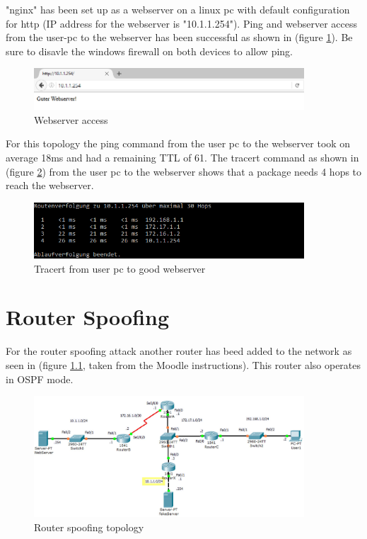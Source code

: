 "nginx" has been set up as a webserver on a linux pc with default configuration for http (IP address for the webserver is "10.1.1.254"). Ping and webserver access from the user-pc to the webserver has been successful as shown in (figure \ref{img:GuterWebserverScreenshot}). Be sure to disavle the windows firewall on both devices to allow ping.

\begin{figure}[H]
	\centering
	\includegraphics[width=0.9\textwidth]{img/GuterWebserverScreenshot.png}
	\caption{Webserver access}
	\label{img:GuterWebserverScreenshot}
\end{figure}

For this topology the ping command from the user pc to the webserver took on average 18ms and had a remaining \ac{TTL} of 61.
The tracert command as shown in (figure \ref{img:TracertGuterWebserver}) from the user pc to the webserver shows that a package needs 4 hops to reach the webserver.

\begin{figure}[H]
	\centering
	\includegraphics[width=0.9\textwidth]{img/TracertGuterWebserver.png}
	\caption{Tracert from user pc to good webserver}
	\label{img:TracertGuterWebserver}
\end{figure}

\chapter{Router Spoofing}

For the router spoofing attack another router has beed added to the network as seen in (figure \ref{img:Router spoofing topology}, taken from the Moodle instructions). This router also operates in \ac{OSPF} mode. 

\begin{figure}[H]
	\centering
	\includegraphics[width=0.9\textwidth]{img/topo_spoofing.png}
	\caption{Router spoofing topology}
	\label{img:Router spoofing topology}
\end{figure}

